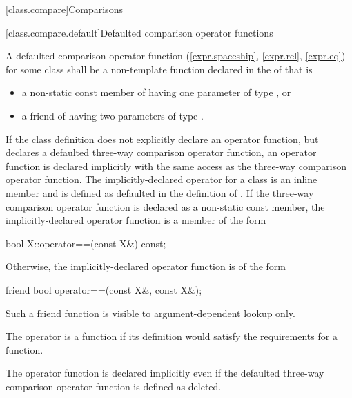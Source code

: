 [class.compare]{Comparisons}%

[class.compare.default]{Defaulted comparison operator functions}%

\pnum
A defaulted comparison operator function (\ref{expr.spaceship}, \ref{expr.rel}, \ref{expr.eq})
for some class 
shall be a non-template function
declared in the  of 
that is
\begin{itemize}
\item a non-static const member of  having one parameter of type , or
\item a friend of  having two parameters of type .
\end{itemize}

\pnum
If the class definition
does not explicitly declare an \tcode{==} operator function,
but declares a defaulted three-way comparison operator function,
an \tcode{==} operator function is declared implicitly
with the same access as the three-way comparison operator function.
The implicitly-declared \tcode{==} operator for a class 
is an inline member and is defined as defaulted in the definition of .
If the three-way comparison operator function
is declared as a non-static const member,
the implicitly-declared \tcode{==} operator function is a member of the form
\begin{codeblock}
bool X::operator==(const X&) const;
\end{codeblock}
Otherwise, the implicitly-declared \tcode{==} operator function is of the form
\begin{codeblock}
friend bool operator==(const X&, const X&);
\end{codeblock}
\begin{note}
Such a friend function is visible
to argument-dependent lookup
only.
\end{note}
The operator is a  function if its definition
would satisfy the requirements for a  function.
\begin{note}
The \tcode{==} operator function is declared implicitly even if
the defaulted three-way comparison operator function is defined as deleted.
\end{note}

